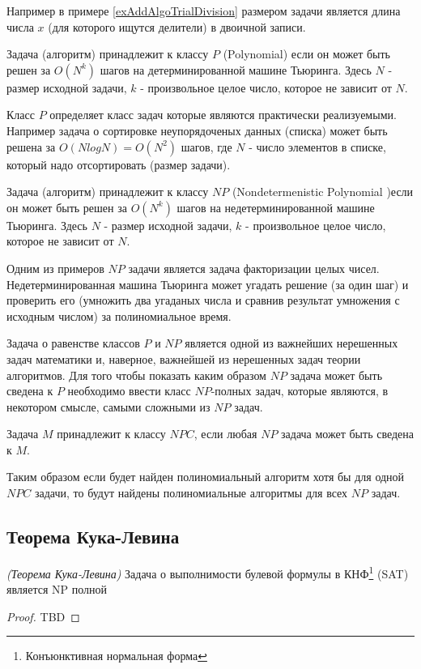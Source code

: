 Например в примере \ref{exAddAlgoTrialDivision} размером задачи
является длина числа $x$ (для которого ищутся делители) в двоичной
записи. 

\begin{definition}[Класс $P$]
Задача (алгоритм) принадлежит к классу $P$ (Polynomial) если он может
быть решен за 
 $O\left(N^k\right)$ шагов на детерминированной машине Тьюринга.
Здесь $N$ - размер исходной задачи, $k$ - произвольное целое число,
которое не зависит от $N$.  
\end{definition}

Класс $P$ определяет класс задач которые являются практически
реализуемыми. Например задача о сортировке неупорядоченых данных
(списка) может быть решена за 
$O\left(N log N \right) = O\left(N^2\right)$ шагов, где $N$ - число
элементов в списке, который надо отсортировать (размер задачи).

\begin{definition}[Класс $NP$]
Задача (алгоритм) принадлежит к классу $NP$ (Nondetermenistic Polynomial )если
он может быть решен за  $O\left(N^k\right)$ шагов на
недетерминированной машине Тьюринга.  Здесь $N$ - размер исходной
задачи, $k$ - произвольное целое число, которое не зависит от $N$. 
\end{definition}

Одним из примеров $NP$ задачи является задача факторизации целых
чисел. Недетерминированная машина Тьюринга может угадать решение (за
один шаг) и проверить его (умножить два угаданых числа и сравнив
результат умножения с исходным числом) за полиномиальное время.

Задача о равенстве классов $P$ и $NP$ является одной из важнейших
нерешенных задач математики и, наверное, важнейшей из нерешенных задач
теории алгоритмов. Для того чтобы показать каким образом $NP$ задача
может быть сведена к  $P$ необходимо ввести класс $NP$-полных задач,
которые являются, в некотором смысле, самыми сложными из $NP$ задач. 

\begin{definition}
Задача $M$ принадлежит к классу $NPC$, если любая $NP$ задача
может быть сведена к $M$.
\end{definition}

Таким образом если будет найден полиномиальный алгоритм хотя бы для
одной $NPC$ задачи, то будут найдены полиномиальные алгоритмы
для всех $NP$ задач. 
 

\subsection{Теорема Кука-Левина}

\begin{theorem}
\emph{(Теорема Кука-Левина)}
Задача о выполнимости булевой формулы в КНФ\footnote{Конъюнктивная нормальная форма} (SAT) является NP полной
\label{theoremAddAlgoCookTheorem}
\end{theorem}

\begin{proof}
TBD
\end{proof}
